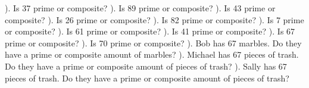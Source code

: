 \documentclass{article}%
\begin{document}
\newline%
). Is 37 prime or composite?%
\newline%
\newline%
). Is 89 prime or composite?%
\newline%
\newline%
). Is 43 prime or composite?%
\newline%
\newline%
). Is 26 prime or composite?%
\newline%
\newline%
). Is 82 prime or composite?%
\newline%
\newline%
). Is 7 prime or composite?%
\newline%
\newline%
). Is 61 prime or composite?%
\newline%
\newline%
). Is 41 prime or composite?%
\newline%
\newline%
). Is 67 prime or composite?%
\newline%
\newline%
). Is 70 prime or composite?%
\newline%
\newline%
). Bob has 67 marbles. Do they have a prime or composite amount of marbles?%
\newline%
\newline%
). Michael has 67 pieces of trash. Do they have a prime or composite amount of pieces of trash?%
\newline%
\newline%
). Sally has 67 pieces of trash. Do they have a prime or composite amount of pieces of trash?%
\newline%
\newline%
\newline%
\end{document}
